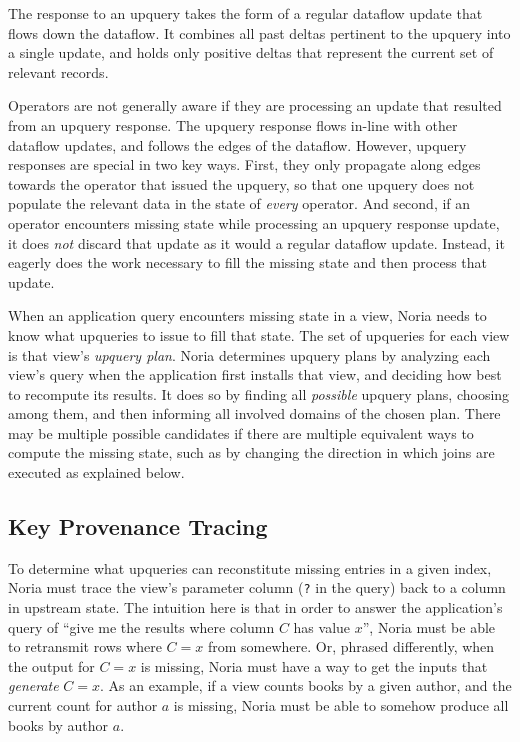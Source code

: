 The response to an upquery takes the form of a regular dataflow update that
flows down the dataflow. It combines all past deltas pertinent to the upquery
into a single update, and holds only positive deltas that represent the current
set of relevant records.

Operators are not generally aware if they are processing an update that resulted
from an upquery response. The upquery response flows in-line with other dataflow
updates, and follows the edges of the dataflow. However, upquery responses are
special in two key ways. First, they only propagate along edges towards the
operator that issued the upquery, so that one upquery does not populate the
relevant data in the state of \emph{every} operator. And second, if an operator
encounters missing state while processing an upquery response update, it does
\emph{not} discard that update as it would a regular dataflow update. Instead,
it eagerly does the work necessary to fill the missing state and then process
that update.

When an application query encounters missing state in a view, Noria needs to
know what upqueries to issue to fill that state. The set of upqueries for each
view is that view's \textit{upquery plan}. Noria determines upquery plans by
analyzing each view's query when the application first installs that view, and
deciding how best to recompute its results. It does so by finding all
\emph{possible} upquery plans, choosing among them, and then informing all
involved domains of the chosen plan. There may be multiple possible candidates
if there are multiple equivalent ways to compute the missing state, such as by
changing the direction in which joins are executed as explained below.

\subsection{Key Provenance Tracing}

To determine what upqueries can reconstitute missing entries in a given index,
Noria must trace the view's parameter column (\texttt{?} in the query) back to a
column in upstream state. The intuition here is that in order to answer the
application's query of ``give me the results where column $C$ has value $x$'',
Noria must be able to retransmit rows where $C = x$ from somewhere. Or, phrased
differently, when the output for $C = x$ is missing, Noria must have a way to
get the inputs that \emph{generate} $C = x$. As an example, if a view counts
books by a given author, and the current count for author $a$ is missing, Noria
must be able to somehow produce all books by author $a$.

